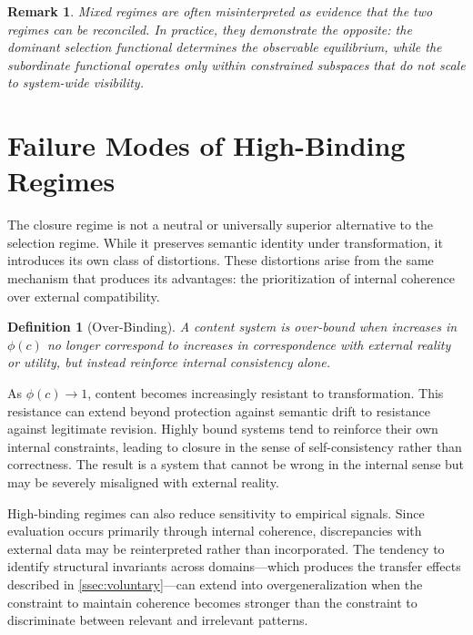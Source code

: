 \documentclass[12pt]{article}
\newtheorem{definition}{Definition}[section]
\newtheorem{remark}{Remark}[section]
\newcommand{\bind}{\phi}
\begin{document}
\begin{remark}
Mixed regimes are often misinterpreted as evidence that the two regimes
can be reconciled. In practice, they demonstrate the opposite: the
dominant selection functional determines the observable equilibrium,
while the subordinate functional operates only within constrained
subspaces that do not scale to system-wide visibility.
\end{remark}

\section{Failure Modes of High-Binding Regimes}
\label{sec:failure}

The closure regime is not a neutral or universally superior alternative
to the selection regime. While it preserves semantic identity under
transformation, it introduces its own class of distortions. These
distortions arise from the same mechanism that produces its advantages:
the prioritization of internal coherence over external compatibility.

\begin{definition}[Over-Binding]
\label{def:overbinding}
A content system is \emph{over-bound} when increases in $\bind(c)$ no
longer correspond to increases in correspondence with external reality
or utility, but instead reinforce internal consistency alone.
\end{definition}

As $\bind(c) \to 1$, content becomes increasingly resistant to
transformation. This resistance can extend beyond protection against
semantic drift to resistance against legitimate revision. Highly bound
systems tend to reinforce their own internal constraints, leading to
closure in the sense of self-consistency rather than correctness. The
result is a system that cannot be wrong in the internal sense but may
be severely misaligned with external reality.

High-binding regimes can also reduce sensitivity to empirical signals.
Since evaluation occurs primarily through internal coherence,
discrepancies with external data may be reinterpreted rather than
incorporated. The tendency to identify structural invariants across
domains---which produces the transfer effects described in
\cref{ssec:voluntary}---can extend into overgeneralization when the
constraint to maintain coherence becomes stronger than the constraint to
discriminate between relevant and irrelevant patterns.
\end{document}

